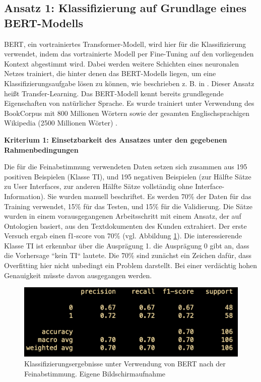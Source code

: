 \subsection{Ansatz 1: Klassifizierung auf Grundlage eines BERT-Modells}

BERT, ein vortrainiertes Transformer-Modell, wird hier für die Klassifizierung verwendet, indem das vortrainierte Modell per Fine-Tuning auf den vorliegenden Kontext abgestimmt wird. Dabei werden weitere Schichten eines neuronalen Netzes trainiert, die hinter denen das BERT-Modells liegen, um eine Klassifizierungsaufgabe lösen zu können, wie beschrieben z. B. in \cite[S. 2]{Tang}. Dieser Ansatz heißt Transfer-Learning. Das BERT-Modell kennt bereits grundlegende Eigenschaften von natürlicher Sprache. Es wurde trainiert unter Verwendung des BookCorpus mit 800 Millionen Wörtern sowie der gesamten Englischsprachigen Wikipedia (2500 Millionen Wörter) \cite{devlin}.

{\bf Kriterium 1: Einsetzbarkeit des Ansatzes unter den gegebenen Rahmenbedingungen}

Die für die Feinabstimmung verwendeten Daten setzen sich zusammen aus 195 positiven Beispielen (Klasse TI), und 195 negativen Beispielen (zur Hälfte Sätze zu User Interfaces, zur anderen Hälfte Sätze vollständig ohne Interface-Information). Sie wurden manuell beschriftet. Es werden 70\% der Daten für das Training verwendet, 15\% für das Testen, und 15\% für die Validierung. Die Sätze wurden in einem vorausgegangenen Arbeitsschritt mit einem Ansatz, der auf Ontologien basiert, aus den Textdokumenten des Kunden extrahiert. Der erste Versuch ergab einen f1-score von 70\% (vgl. Abbildung \ref{Abbildung:bert-confusion}). Die interessierende Klasse TI ist erkennbar über die Ausprägung 1. die Ausprägung 0 gibt an, dass die Vorhersage ``kein TI`` lautete. Die 70\% sind zunächst ein Zeichen dafür, dass Overfitting hier nicht unbedingt ein Problem darstellt. Bei einer verdächtig hohen Genauigkeit müsste davon ausgegangen werden.
 
\begin{figure}[h]
\centering
\includegraphics[scale=0.95]{content/pics/Picture_23.png}
\caption{Klassifizierungsergebnisse unter Verwendung von BERT nach der Feinabstimmung. Eigene Bildschirmaufnahme}
\label{Abbildung:bert-confusion}
\end{figure}

